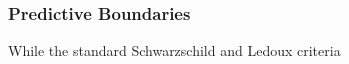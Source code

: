 {\color{brown}
\subsubsection{Predictive Boundaries}

While the standard Schwarzschild and Ledoux criteria 

}